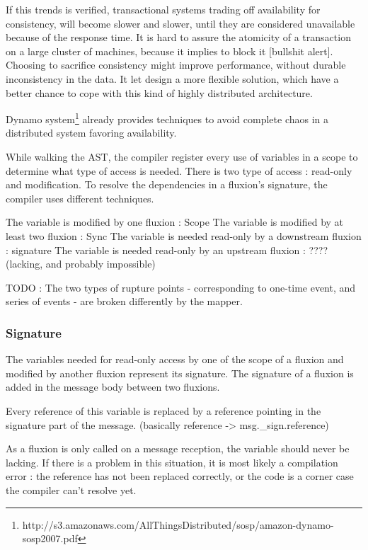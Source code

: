 If this trends is verified, transactional systems trading off availability for consistency, will become slower and slower, until they are considered unavailable because of the response time.
It is hard to assure the atomicity of a transaction on a large cluster of machines, because it implies to block it [bullshit alert].
Choosing to sacrifice consistency might improve performance, without durable inconsistency in the data.
It let design a more flexible solution, which have a better chance to cope with this kind of highly distributed architecture.


Dynamo system\footnote{http://s3.amazonaws.com/AllThingsDistributed/sosp/amazon-dynamo-sosp2007.pdf} already provides techniques to avoid complete chaos in a distributed system favoring availability.





While walking the AST, the compiler register every use of variables in a scope to determine what type of access is needed.
There is two type of access : read-only and modification.
To resolve the dependencies in a fluxion's signature, the compiler uses different techniques.

The variable is modified by one fluxion : Scope
The variable is modified by at least two fluxion : Sync
The variable is needed read-only by a downstream fluxion : signature
The variable is needed read-only by an upstream fluxion : ???? (lacking, and probably impossible)

TODO :
The two types of rupture points - corresponding to one-time event, and series of events - are broken differently by the mapper.


\subsubsection{Signature}

  The variables needed for read-only access by one of the scope of a fluxion and modified by another fluxion represent its signature.
  The signature of a fluxion is added in the message body between two fluxions.

  Every reference of this variable is replaced by a reference pointing in the signature part of the message.
  (basically reference -> msg.\_sign.reference)

  As a fluxion is only called on a message reception, the variable should never be lacking.
  If there is a problem in this situation, it is most likely a compilation error : the reference has not been replaced correctly, or the code is a corner case the compiler can't resolve yet.

